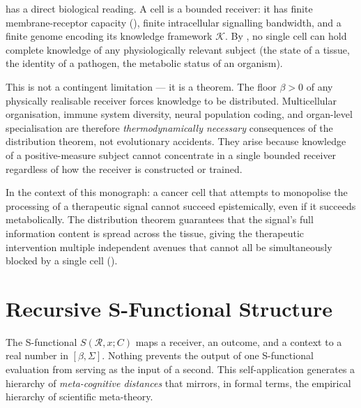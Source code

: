 \begin{remark}
\label{rem:no-single-cell}
 has a direct biological reading.  A cell is a bounded
receiver: it has finite membrane-receptor capacity (),
finite intracellular signalling bandwidth, and a finite genome encoding its
knowledge framework $\mathcal{K}$.  By , no
single cell can hold complete knowledge of any physiologically relevant subject
(the state of a tissue, the identity of a pathogen, the metabolic status of an
organism).

This is not a contingent limitation — it is a theorem.  The floor $\beta > 0$
of any physically realisable receiver forces knowledge to be distributed.
Multicellular organisation, immune system diversity, neural population coding,
and organ-level specialisation are therefore \emph{thermodynamically necessary}
consequences of the distribution theorem, not evolutionary accidents.  They
arise because knowledge of a positive-measure subject cannot concentrate in a
single bounded receiver regardless of how the receiver is constructed or
trained.

In the context of this monograph: a cancer cell that attempts to monopolise
the processing of a therapeutic signal cannot succeed epistemically, even if
it succeeds metabolically.  The distribution theorem guarantees that the
signal's full information content is spread across the tissue, giving the
therapeutic intervention multiple independent avenues that cannot all be
simultaneously blocked by a single cell (\cf {}).
\end{remark}

\section{Recursive S-Functional Structure}
\label{sec:ch02-recursive-structure}

The S-functional $S(\mathcal{R}, x; C)$ maps a receiver, an outcome, and a
context to a real number in $[\beta, \Sigma]$.  Nothing prevents the output of
one S-functional evaluation from serving as the input of a second.  This
self-application generates a hierarchy of \emph{meta-cognitive distances} that
mirrors, in formal terms, the empirical hierarchy of scientific meta-theory.

